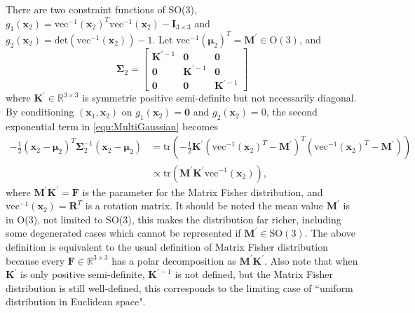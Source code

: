 \documentclass[12pt]{article}
\begin{document}
There are two constraint functions of SO(3), $g_1(\bm{x}_2) = \mathrm{vec}^{-1}(\bm{x}_2)^T\mathrm{vec}^{-1}(\bm{x}_2)-\mathbf{I}_{3\times 3}$ and $g_2(\bm{x}_2) = \mathrm{det}(\mathrm{vec}^{-1}(\bm{x}_2))-1$.
Let $\mathrm{vec}^{-1}(\bm{\mu}_2)^T = \mathbf{M}^\prime\in\mathrm{O}(3)$, and
\begin{equation} \label{eqn:sigma2}
\mathbf{\Sigma}_2 = \left[\begin{matrix}
\mathbf{K}^{\prime-1} & \mathbf{0} & \mathbf{0} \\
\mathbf{0} & \mathbf{K}^{\prime-1} & \mathbf{0} \\
\mathbf{0} & \mathbf{0} & \mathbf{K}^{\prime-1}
\end{matrix}\right]
\end{equation}
where $\mathbf{K}^\prime\in\mathbb{R}^{3\times3}$ is symmetric positive semi-definite but not necessarily diagonal.
By conditioning $(\bm{x}_1,\bm{x}_2)$ on $g_1(\bm{x}_2)=\bm{0}$ and $g_2(\bm{x}_2)=0$, the second exponential term in \eqref{eqn:MultiGaussian} becomes
\begin{equation}
\begin{split}
-\frac{1}{2}(\bm{x}_2-\bm{\mu}_2)^T\mathbf{\Sigma}_2^{-1}(\bm{x}_2-\bm{\mu}_2) &= \mathrm{tr}\left(-\frac{1}{2}\mathbf{K}^\prime(\mathrm{vec}^{-1}(\bm{x}_2)^T-\mathbf{M}^\prime)^T(\mathrm{vec}^{-1}(\bm{x}_2)^T-\mathbf{M}^\prime)\right) \\
&\propto \mathrm{tr}(\mathbf{M}^\prime\mathbf{K}^\prime\mathrm{vec}^{-1}(\bm{x}_2)),
\end{split}
\end{equation}
where $\mathbf{M}^\prime\mathbf{K}^\prime=\mathbf{F}$ is the parameter for the Matrix Fisher distribution, and $\mathrm{vec}^{-1}(\bm{x}_2)=\mathbf{R}^T$ is a rotation matrix.
It should be noted the mean value $\mathbf{M}^\prime$ is in O(3), not limited to SO(3), this makes the distribution far richer, including some degenerated cases which cannot be represented if $\mathbf{M}^\prime\in\mathrm{SO}(3)$.
The above definition is equivalent to the usual definition of Matrix Fisher distribution because every $\mathbf{F}\in\mathbb{R}^{3\times 3}$ has a polar decomposition as $\mathbf{M}^\prime\mathbf{K}^\prime$.
Also note that when $\mathbf{K}^\prime$ is only positive semi-definite, $\mathbf{K}^{\prime-1}$ is not defined, but the Matrix Fisher distribution is still well-defined, this corresponds to the limiting case of ``uniform distribution in Euclidean space".
\end{document}
